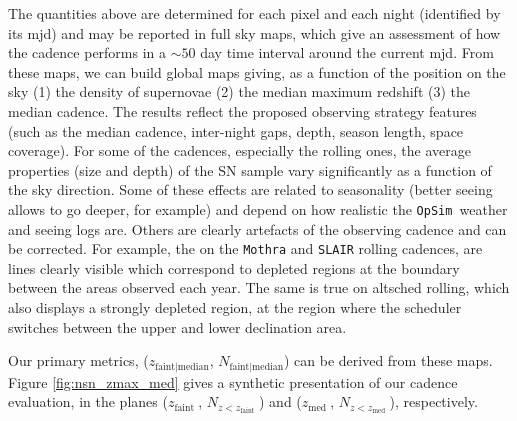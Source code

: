 \documentclass[a4paper,10pt]{article}
\newcommand{\zfaint}{$z_{\mathrm{faint}}\ $}
\newcommand{\nsnfaint}{$N_{z<z_{\mathrm{faint}}}\ $}
\newcommand{\zmed}{$z_{\mathrm{med}}\ $}
\newcommand{\nsnmed}{$N_{z<z_{\mathrm{med}}}\ $}
\newcommand{\opsim}{{\tt OpSim\ }}
\begin{document}
The quantities above are determined for each pixel and each night
(identified by its mjd) and may be reported in full sky maps, which give
an assessment of how the cadence performs in a $\sim 50$ day time
interval around the current mjd. From these maps, we can build global
maps giving, as a function of the position on the sky (1) the density
of supernovae (2) the median maximum redshift (3) the median cadence.
The results reflect the proposed observing strategy features (such as the median cadence, inter-night gaps, depth, season length, space coverage). For some of the cadences, especially the rolling ones, the average properties (size and
depth) of the SN sample vary significantly as a function of the sky
direction. Some of these effects are related to seasonality (better
seeing allows to go deeper, for example) and depend on how realistic
the \opsim weather and seeing logs are. Others are clearly artefacts
of the observing cadence and can be corrected. For example, the on the
{\tt Mothra} and {\tt SLAIR} rolling cadences, are lines clearly
visible which correspond to depleted regions at the boundary between
the areas observed each year. The same is true on altsched rolling,
which also displays a strongly depleted region, at the region where
the scheduler switches between the upper and lower declination area.

Our primary metrics, ($z_{\mathrm{faint|median}}$, $N_{\mathrm{faint|median}}$) can be derived from these
maps.  Figure \ref{fig:nsn_zmax_med}
gives a synthetic presentation of our cadence evaluation, in the planes
(\zfaint, \nsnfaint) and (\zmed, \nsnmed), respectively.
\end{document}

